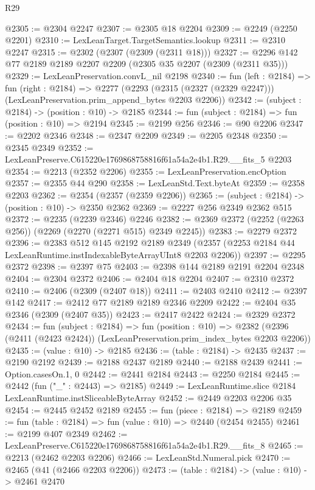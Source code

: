 \begin{lexlean}{R29}
\begin{coremodule}
@2305 := @2304 @2247
@2307 := @2305 @18 @2204
@2309 := @2249 (@2250 @2201)
@2310 := LexLeanTarget.TargetSemantics.lookup
@2311 := @2310 @2247
@2315 := @2302 (@2307 (@2309 (@2311 @18)))
@2327 := @2296 @142 @77 @2189 @2189 @2207 @2209 (@2305 @35 @2207 (@2309 (@2311 @35)))
@2329 := LexLeanPreservation.convL_nil @2198
@2340 := fun (left : @2184) =>
  fun (right : @2184) =>
  @2277 (@2293 (@2315 (@2327 (@2329 @2247))) (LexLeanPreservation.prim_append_bytes @2203 @2206))
@2342 := (subject : @2184) -> (position : @10) -> @2185
@2344 := fun (subject : @2184) => fun (position : @10) => @2194
@2345 := @2199 @256
@2346 := @90 @2206
@2347 := @2202 @2346
@2348 := @2347 @2209
@2349 := @2205 @2348
@2350 := @2345 @2349
@2352 := LexLeanPreserve.C615220e1769868758816f61a54a2e4b1.R29.__fits_5 @2203
@2354 := @2213 (@2352 @2206)
@2355 := LexLeanPreservation.encOption
@2357 := @2355 @44 @290
@2358 := LexLeanStd.Text.byteAt
@2359 := @2358 @2203
@2362 := @2354 (@2357 (@2359 @2206))
@2365 := (subject : @2184) -> (position : @10) -> @2350 @2362
@2369 := @2227 @256 @2349 @2362 @515
@2372 := @2235 (@2239 @2346) @2246
@2382 := @2369 @2372 (@2252 (@2263 @256)) (@2269 (@2270 (@2271 @515) @2349 @2245))
@2383 := @2279 @2372
@2396 := @2383
    @512
    @145
    @2192
    @2189
    @2349
    (@2357 (@2253 @2184 @44 LexLeanRuntime.instIndexableByteArrayUInt8 @2203 @2206))
@2397 := @2295 @2372
@2398 := @2397 @75
@2403 := @2398 @144 @2189 @2191 @2204 @2348
@2404 := @2304 @2372
@2406 := @2404 @18 @2204
@2407 := @2310 @2372
@2410 := @2406 (@2309 (@2407 @18))
@2411 := @2403 @2410
@2412 := @2397 @142
@2417 := @2412 @77 @2189 @2189 @2346 @2209
@2422 := @2404 @35 @2346 (@2309 (@2407 @35))
@2423 := @2417 @2422
@2424 := @2329 @2372
@2434 := fun (subject : @2184) =>
  fun (position : @10) =>
  @2382 (@2396 (@2411 (@2423 @2424)) (LexLeanPreservation.prim_index_bytes @2203 @2206))
@2435 := (value : @10) -> @2185
@2436 := (table : @2184) -> @2435
@2437 := @2190 @2192
@2439 := @2188 @2437 @2189
@2440 := @2188 @2439
@2441 := Option.casesOn.{1, 0}
@2442 := @2441 @2184
@2443 := @2250 @2184
@2445 := @2442 (fun ("_" : @2443) => @2185)
@2449 := LexLeanRuntime.slice @2184 LexLeanRuntime.instSliceableByteArray
@2452 := @2449 @2203 @2206 @35
@2454 := @2445 @2452 @2189
@2455 := fun (piece : @2184) => @2189
@2459 := fun (table : @2184) => fun (value : @10) => @2440 (@2454 @2455)
@2461 := @2199 @407 @2349
@2462 := LexLeanPreserve.C615220e1769868758816f61a54a2e4b1.R29.__fits_8
@2465 := @2213 (@2462 @2203 @2206)
@2466 := LexLeanStd.Numeral.pick
@2470 := @2465 (@41 (@2466 @2203 @2206))
@2473 := (table : @2184) -> (value : @10) -> @2461 @2470

\end{coremodule}
\end{lexlean}
